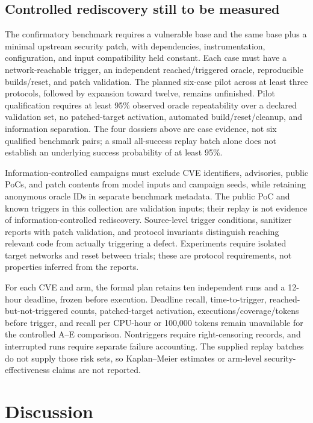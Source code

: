 \documentclass[final,5p,times,number]{elsarticle}
\begin{document}
\subsection{Controlled rediscovery still to be measured}
The confirmatory benchmark requires a vulnerable base and the same base plus a minimal upstream security patch, with dependencies, instrumentation, configuration, and input compatibility held constant. Each case must have a network-reachable trigger, an independent reached/triggered oracle, reproducible builds/reset, and patch validation. The planned six-case pilot across at least three protocols, followed by expansion toward twelve, remains unfinished. Pilot qualification requires at least 95\% observed oracle repeatability over a declared validation set, no patched-target activation, automated build/reset/cleanup, and information separation. The four dossiers above are case evidence, not six qualified benchmark pairs; a small all-success replay batch alone does not establish an underlying success probability of at least 95\%.

Information-controlled campaigns must exclude CVE identifiers, advisories, public PoCs, and patch contents from model inputs and campaign seeds, while retaining anonymous oracle IDs in separate benchmark metadata. The public PoC and known triggers in this collection are validation inputs; their replay is not evidence of information-controlled rediscovery. Source-level trigger conditions, sanitizer reports with patch validation, and protocol invariants distinguish reaching relevant code from actually triggering a defect. Experiments require isolated target networks and reset between trials; these are protocol requirements, not properties inferred from the reports.

For each CVE and arm, the formal plan retains ten independent runs and a 12-hour deadline, frozen before execution. Deadline recall, time-to-trigger, reached-but-not-triggered counts, patched-target activation, executions/coverage/tokens before trigger, and recall per CPU-hour or 100,000 tokens remain unavailable for the controlled A--E comparison. Nontriggers require right-censoring records, and interrupted runs require separate failure accounting. The supplied replay batches do not supply those risk sets, so Kaplan--Meier estimates or arm-level security-effectiveness claims are not reported.

\section{Discussion}
\end{document}
